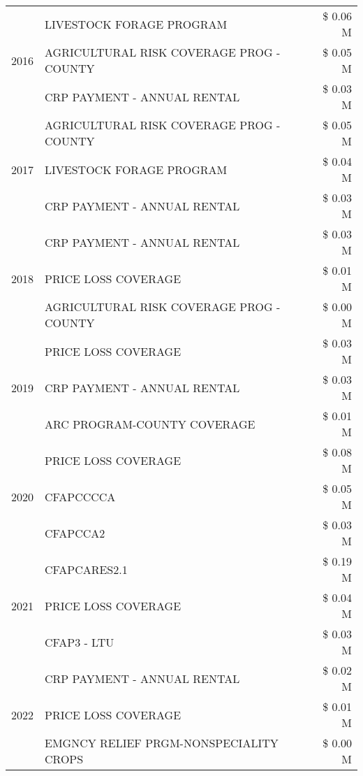 \begin{tabular}{llr}
\cline{1-3}
\multirow[t]{3}{*}{2016} & LIVESTOCK FORAGE PROGRAM & \$ 0.06 M \\
 & AGRICULTURAL RISK COVERAGE PROG - COUNTY & \$ 0.05 M \\
 & CRP PAYMENT - ANNUAL RENTAL & \$ 0.03 M \\
\cline{1-3}
\multirow[t]{3}{*}{2017} & AGRICULTURAL RISK COVERAGE PROG - COUNTY & \$ 0.05 M \\
 & LIVESTOCK FORAGE PROGRAM & \$ 0.04 M \\
 & CRP PAYMENT - ANNUAL RENTAL & \$ 0.03 M \\
\cline{1-3}
\multirow[t]{3}{*}{2018} & CRP PAYMENT - ANNUAL RENTAL & \$ 0.03 M \\
 & PRICE LOSS COVERAGE & \$ 0.01 M \\
 & AGRICULTURAL RISK COVERAGE PROG - COUNTY & \$ 0.00 M \\
\cline{1-3}
\multirow[t]{3}{*}{2019} & PRICE LOSS COVERAGE & \$ 0.03 M \\
 & CRP PAYMENT - ANNUAL RENTAL & \$ 0.03 M \\
 & ARC PROGRAM-COUNTY COVERAGE & \$ 0.01 M \\
\cline{1-3}
\multirow[t]{3}{*}{2020} & PRICE LOSS COVERAGE & \$ 0.08 M \\
 & CFAPCCCCA & \$ 0.05 M \\
 & CFAPCCA2 & \$ 0.03 M \\
\cline{1-3}
\multirow[t]{3}{*}{2021} & CFAPCARES2.1 & \$ 0.19 M \\
 & PRICE LOSS COVERAGE & \$ 0.04 M \\
 & CFAP3 - LTU & \$ 0.03 M \\
\cline{1-3}
\multirow[t]{3}{*}{2022} & CRP PAYMENT - ANNUAL RENTAL & \$ 0.02 M \\
 & PRICE LOSS COVERAGE & \$ 0.01 M \\
 & EMGNCY RELIEF PRGM-NONSPECIALITY CROPS & \$ 0.00 M \\
\cline{1-3}
\bottomrule
\end{tabular}
